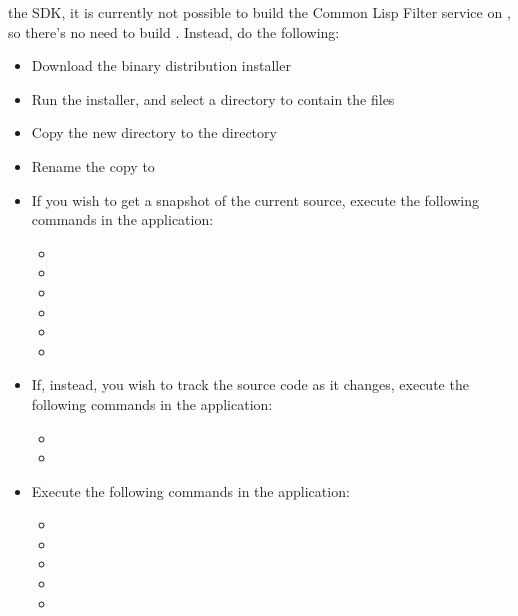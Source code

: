 the \win{} SDK, it is currently not possible to build the Common Lisp Filter service on
\win, so there's no need to build \textbf{\ECL}.
Instead, do the following:
\begin{itemize}
\item Download the
{\win{} binary distribution installer}
\item\exSp{}Run the installer, and select a directory to contain the \ECL{} files
\item\exSp{}Copy the new directory to the directory
\item\exSp{}Rename the copy to 
\end{itemize}
\tertiaryEnd
{}
\begin{itemize}
\item If you wish to get a snapshot of the current source, execute the following
commands in the  application:
\begin{itemize}
\item {}
\item\exSp{}
\item\exSp{}
\item\exSp{}
\item\exSp{}
\item\exSp{}
\end{itemize}
\item\exSp{}If, instead, you wish to track the source code as it changes, execute the
following commands in the  application:
\begin{itemize}
\item {}
\item\exSp{}
\end{itemize}
\item\exSp{}Execute the following commands in the  application:
\begin{itemize}
\item\exSp{}
\item\exSp{}
\item\exSp{}
\item\exSp{}
\item\exSp{}
\end{itemize}
\end{itemize}
